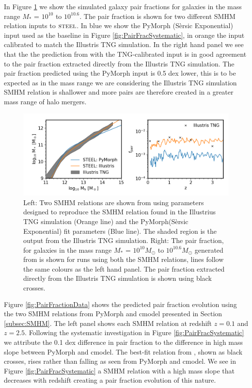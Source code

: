 In Figure \ref{fig:PairFractionIll} we show the simulated galaxy pair fractions for galaxies in the mass range $M_*$ = $10^{10}$ to $10^{10.6}$. The pair fraction is shown for two different SMHM relation inputs to $\textsc{steel}$. In blue we show the PyMorph (S\`ersic Exponential) input used as the baseline in Figure \ref{fig:PairFracSystematic}, in orange the input calibrated to match the Illustris TNG simulation. In the right hand panel we see that the the prediction from \steel with the TNG-calibrated input is in good agreement to the pair fraction extracted directly from the Illustris TNG simulation. The pair fraction predicted using the PyMorph input is 0.5 dex lower, this is to be expected as in the mass range we are considering the Illustris TNG simulation SMHM relation is shallower and more pairs are therefore created in a greater mass range of halo mergers. 
\begin{figure}
	\centering
	\includegraphics[width = \linewidth]{Figures/Chapter5/PairFractionIllustris.png}
    \caption{Left: Two SMHM relations are shown from \steel using parameters designed to reproduce the SMHM relation found in the Illustrius TNG simulation (Orange line) and the PyMorph(S\`ersic Exponential) fit parameters (Blue line). The shaded region is the output from the Illustris TNG simulation. Right: The pair fraction, for galaxies in the mass range $M_*$ = $10^{10}M_{\odot}$ to $10^{10.6}M_{\odot}$ generated from \steel is shown for runs using both the SMHM relations, lines follow the same colours as the left hand panel. The pair fraction extracted directly from the Illustris TNG simulation is shown using black crosses.}
	\label{fig:PairFractionIll}
\end{figure}

Figure \ref{fig:PairFractionData} shows the predicted pair fraction evolution using the two SMHM relations from PyMorph and cmodel presented in Section \ref{subsec:SMHM}. The left panel shows each SMHM relation at redshift $z = 0.1$ and $z = 2.5$. Following the systematic investigation in Figure \ref{fig:PairFracSystematic} we attribute the 0.1 dex difference in pair fraction to the difference in high mass slope between PyMorph and cmodel. The best-fit relation from \citet{Mundy2017A3.5}, shown as black crosses, rises rather than falling as seen from PyMorph and cmodel. We see in Figure \ref{fig:PairFracSystematic} a SMHM relation with a high mass slope that decreases with redshift creating a pair fraction evolution of this nature.

